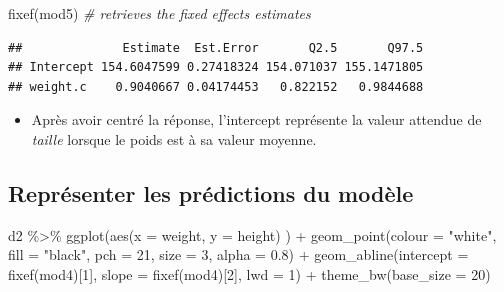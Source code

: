 \documentclass[
  a4paper,11pt,twoside,onecolumn,openright,final,oldfontcommands]{memoir}
\newenvironment{Shaded}{\begin{snugshade}}{\end{snugshade}}
\newcommand{\AttributeTok}[1]{\textcolor[rgb]{0.77,0.63,0.00}{#1}}
\newcommand{\CommentTok}[1]{\textcolor[rgb]{0.56,0.35,0.01}{\textit{#1}}}
\newcommand{\DecValTok}[1]{\textcolor[rgb]{0.00,0.00,0.81}{#1}}
\newcommand{\FloatTok}[1]{\textcolor[rgb]{0.00,0.00,0.81}{#1}}
\newcommand{\FunctionTok}[1]{\textcolor[rgb]{0.00,0.00,0.00}{#1}}
\newcommand{\NormalTok}[1]{#1}
\newcommand{\SpecialCharTok}[1]{\textcolor[rgb]{0.00,0.00,0.00}{#1}}
\newcommand{\StringTok}[1]{\textcolor[rgb]{0.31,0.60,0.02}{#1}}
\providecommand{\tightlist}{%
  \setlength{\itemsep}{0pt}\setlength{\parskip}{0pt}}
\theoremstyle{definition}
\theoremstyle{definition}
\theoremstyle{definition}
\theoremstyle{definition}
\theoremstyle{remark}
\begin{document}
\begin{Shaded}
\begin{Highlighting}[]
\FunctionTok{fixef}\NormalTok{(mod5) }\CommentTok{\# retrieves the fixed effects estimates}
\end{Highlighting}
\end{Shaded}

\begin{verbatim}
##              Estimate  Est.Error       Q2.5       Q97.5
## Intercept 154.6047599 0.27418324 154.071037 155.1471805
## weight.c    0.9040667 0.04174453   0.822152   0.9844688
\end{verbatim}

\begin{itemize}
\tightlist
\item
  Après avoir centré la réponse, l'intercept représente la valeur attendue de \emph{taille} lorsque le poids est à sa valeur moyenne.
\end{itemize}

\hypertarget{repruxe9senter-les-pruxe9dictions-du-moduxe8le}{%
\subsection{Représenter les prédictions du modèle}\label{repruxe9senter-les-pruxe9dictions-du-moduxe8le}}

\begin{Shaded}
\begin{Highlighting}[]
\NormalTok{d2 }\SpecialCharTok{\%\textgreater{}\%}
    \FunctionTok{ggplot}\NormalTok{(}\FunctionTok{aes}\NormalTok{(}\AttributeTok{x =}\NormalTok{ weight, }\AttributeTok{y =}\NormalTok{ height) ) }\SpecialCharTok{+}
    \FunctionTok{geom\_point}\NormalTok{(}\AttributeTok{colour =} \StringTok{"white"}\NormalTok{, }\AttributeTok{fill =} \StringTok{"black"}\NormalTok{, }\AttributeTok{pch =} \DecValTok{21}\NormalTok{, }\AttributeTok{size =} \DecValTok{3}\NormalTok{, }\AttributeTok{alpha =} \FloatTok{0.8}\NormalTok{) }\SpecialCharTok{+}
    \FunctionTok{geom\_abline}\NormalTok{(}\AttributeTok{intercept =} \FunctionTok{fixef}\NormalTok{(mod4)[}\DecValTok{1}\NormalTok{], }\AttributeTok{slope =} \FunctionTok{fixef}\NormalTok{(mod4)[}\DecValTok{2}\NormalTok{], }\AttributeTok{lwd =} \DecValTok{1}\NormalTok{) }\SpecialCharTok{+}
    \FunctionTok{theme\_bw}\NormalTok{(}\AttributeTok{base\_size =} \DecValTok{20}\NormalTok{)}
\end{Highlighting}
\end{Shaded}
\end{document}
